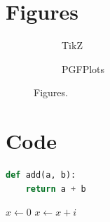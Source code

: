 \documentclass[11pt]{article}
\begin{document}
\section{Figures}
\begin{figure}[H]
  \centering
  \begin{subfigure}{0.45\textwidth}
    \caption{TikZ}
  \end{subfigure}
  \begin{subfigure}{0.45\textwidth}
    \caption{PGFPlots}
  \end{subfigure}
  \caption{Figures.}
\end{figure}

\section{Code}
\begin{lstlisting}[language=Python]
def add(a, b):
    return a + b
\end{lstlisting}
\begin{algorithm}[H]
  \caption{Algorithm}
  \begin{algorithmic}[1]
    \State $x \gets 0$
     \State $x \gets x + i$ \EndFor
  \end{algorithmic}
\end{algorithm}



\end{document}
